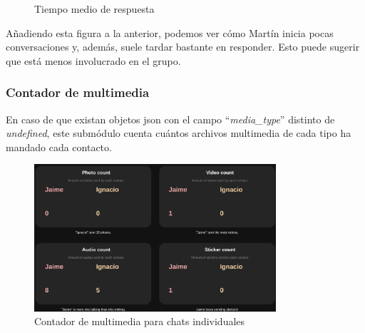 \begin{figure}[H]
	\centering
	\qquad
	\caption{Tiempo medio de respuesta}
	\label{fig:chap4:avg_response_time}
\end{figure}

Añadiendo esta figura a la anterior, podemos ver cómo Martín inicia pocas conversaciones y, además, suele tardar bastante en responder. Esto puede sugerir que está menos involucrado en el grupo.


\subsubsection{Contador de multimedia}

En caso de que existan objetos \acrshort{json} con el campo ``\textit{media\_type}'' distinto de \textit{undefined}, este submódulo cuenta cuántos archivos multimedia de cada tipo ha mandado cada contacto.


\begin{figure}[h]
	\centering
	\includegraphics[width=0.8\textwidth]{img/media_count_individual.png}
	\caption{Contador de multimedia para chats individuales}
	\label{fig:chap4:media_count_individual}
\end{figure}


